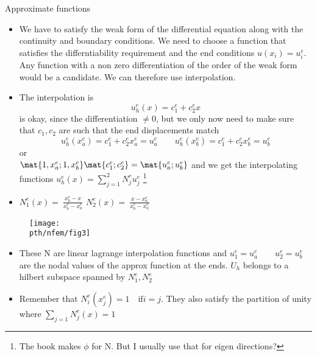 	\begin{frame}{Approximate functions}
		\begin{itemize}
			\item We have to satisfy the weak form of the differential equation along with the continuity and boundary conditions. We need to choose a function that satisfies the differntiability requirement and the end conditions $u(x_i) = u^e_i$.
			Any function with a non zero differentiation of the order of the weak form would be a candidate. We can therefore use interpolation.
			\item The interpolation is
			\begin{equation}
				u^e_h(x) = c_1^e + c_2^e x
			\end{equation}
			is okay, since the differentiation $\neq 0$, but we only now need to make sure that $c_1, c_2$ are such that the end displacements match
			\begin{equation}
				u^e_h(x_a^e) = c_1^e + c_2^ex_a^e = u_a^e \qquad
				u^e_h(x_b^e) = c_1^e + c_2^ex_b^e = u_b^e
			\end{equation}
			or \\
			$\mat{1,x_a^e;1,x_b^e} \mat{c_1^e;c_2^e} = \mat{u_a^e;u_b^e}$
			and we get the interpolating functions $u_h^e(x) = \sum_{j=1}^{2} N_j^eu_j^e$ \footnote{The book makes $\phi$ for N. But I usually use that for eigen directions?} 
			\item $N_1^e(x) = \ \frac{x_b^e-x}{x_b^e-x_a^e}$ \qquad $N_2^e(x) = \ \frac{x-x_a^e}{x_b^e-x_a^e}$
		\end{itemize}
	\end{frame}

	
	\begin{frame}
		\begin{figure}
			\centering
			\texttt{[image: \\pth/nfem/fig3]} 
		\end{figure}
		\begin{itemize}
			\item These N are linear lagrange interpolation functions and $u_1^e = u_a^e \qquad u_2^e = u_b^e$ are the nodal values of the approx function at the ends. $U_h$ belongs to a hilbert subspace spanned by $N_1^e,N_2^e$
			\item Remember that $N_i^e(x^e_j) = 1 \quad \text{if} i=j$. They also satisfy the partition of unity where $\sum_{j=1} N_j^e(x) =1$
			
		\end{itemize}
	\end{frame}


